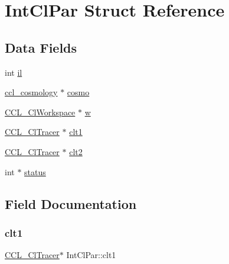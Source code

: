 \hypertarget{struct_int_cl_par}{}\section{Int\+Cl\+Par Struct Reference}
\label{struct_int_cl_par}
\subsection*{Data Fields}
\begin{DoxyCompactItemize}
\item 
int \mbox{\hyperlink{struct_int_cl_par_aedeff726ecb71019ecc8b5784d825060}{il}}
\item 
\mbox{\hyperlink{structccl__cosmology}{ccl\+\_\+cosmology}} $\ast$ \mbox{\hyperlink{struct_int_cl_par_a23ea5c0ad9cf5813be51906bfe326c7d}{cosmo}}
\item 
\mbox{\hyperlink{struct_c_c_l___cl_workspace}{C\+C\+L\+\_\+\+Cl\+Workspace}} $\ast$ \mbox{\hyperlink{struct_int_cl_par_a1b7adafbc56d9fdb5edbe80c950062b6}{w}}
\item 
\mbox{\hyperlink{struct_c_c_l___cl_tracer}{C\+C\+L\+\_\+\+Cl\+Tracer}} $\ast$ \mbox{\hyperlink{struct_int_cl_par_a6a1d336b42313fbd80f79b3e465f3d7f}{clt1}}
\item 
\mbox{\hyperlink{struct_c_c_l___cl_tracer}{C\+C\+L\+\_\+\+Cl\+Tracer}} $\ast$ \mbox{\hyperlink{struct_int_cl_par_a730347547f437f2de5e1dac6791f0b02}{clt2}}
\item 
int $\ast$ \mbox{\hyperlink{struct_int_cl_par_abc2ccba43ee24664930d4471badeba83}{status}}
\end{DoxyCompactItemize}


\subsection{Field Documentation}
\mbox{\label{struct_int_cl_par_a6a1d336b42313fbd80f79b3e465f3d7f}} 
\subsubsection{\texorpdfstring{clt1}{clt1}}
{\footnotesize\ttfamily \mbox{\hyperlink{struct_c_c_l___cl_tracer}{C\+C\+L\+\_\+\+Cl\+Tracer}}$\ast$ Int\+Cl\+Par\+::clt1}

\mbox{\label{struct_int_cl_par_a730347547f437f2de5e1dac6791f0b02}} 
